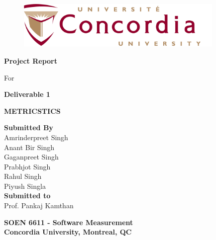 \documentclass[letterpaper,12pt]{article}
\begin{document}
\begin{titlepage}

\begin{center}
\vspace*{-1.2in}
\begin{figure}[htb]
\begin{center}
\includegraphics[width=10cm]{Concordia_logo.png}
\end{center}
\end{figure}
\begin{Large}
\vspace*{0.3in}
\textbf{Project Report} \\
\end{Large}
\vspace*{0.1in}
\begin{Large}
For\\
\end{Large}
\vspace*{0.1in}

\begin{Large}
\textbf{Deliverable 1} \\
\end{Large}
\vspace*{0.1in}

\begin{Large}
\textbf{METRICSTICS} \\
\end{Large}
\vspace*{0.3in}

\begin{large}
\textbf{Submitted By} \\
\vspace*{0.1in}
Amrinderpreet Singh\\
Anant Bir Singh\\
Gaganpreet Singh\\
Prabhjot Singh\\
Rahul Singh\\
Piyush Singla\\
\vspace*{0.2in}
\textbf{Submitted to}\\
\vspace*{0.1in}
Prof. Pankaj Kamthan\\
\vspace*{0.3in}

\begin{Large}
\textbf{SOEN 6611 - Software Measurement} \\
\vspace*{0.2in}
\textbf{Concordia University, Montreal, QC}
\end{Large}

\end{large}
\end{center}
\end{titlepage}
\end{document}
